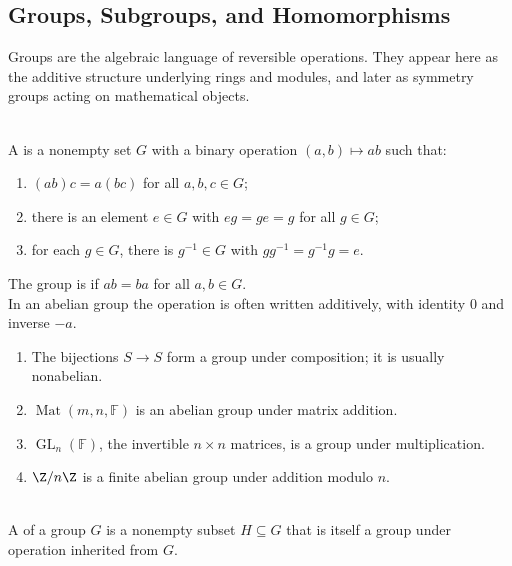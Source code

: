 \subsection{Groups, Subgroups, and Homomorphisms}

Groups are the algebraic language of reversible operations. They appear here as the additive structure underlying rings and modules, and later as symmetry groups acting on mathematical objects.

\begin{definition} \label{def:group-and-abelian-group} \\
A  is a nonempty set $G$ with a binary operation $(a,b)\mapsto ab$ such that:
\begin{enumerate}[label=(\roman*)]
\setlength{\itemsep}{0pt}
\item $(ab)c=a(bc)$ for all $a,b,c\in G$;
\item there is an element $e\in G$ with $eg=ge=g$ for all $g\in G$;
\item for each $g\in G$, there is $g^{-1}\in G$ with $gg^{-1}=g^{-1}g=e$.
\end{enumerate}
The group is  if $ab=ba$ for all $a,b\in G$.\\
In an abelian group the operation is often written additively, with identity $0$ and inverse $-a$.
\end{definition}

\begin{example} \label{ex:basic-groups-from-linear-algebra} 
\begin{enumerate}[label=(\roman*)]
\setlength{\itemsep}{0pt}
\item The bijections $S\to S$ form a group under composition; it is usually nonabelian.
\item $\operatorname{Mat}(m,n,\mathbb{F})$ is an abelian group under matrix addition.
\item $\operatorname{GL}_n(\mathbb{F})$, the invertible $n\times n$ matrices, is a group under multiplication.
\item $\Z/n\Z$ is a finite abelian group under addition modulo $n$.
\end{enumerate}
\end{example}

\begin{definition} \label{def:subgroup} \\
A  of a group $G$ is a nonempty subset $H\subseteq G$ that is itself a group under operation inherited from $G$.
\end{definition}

